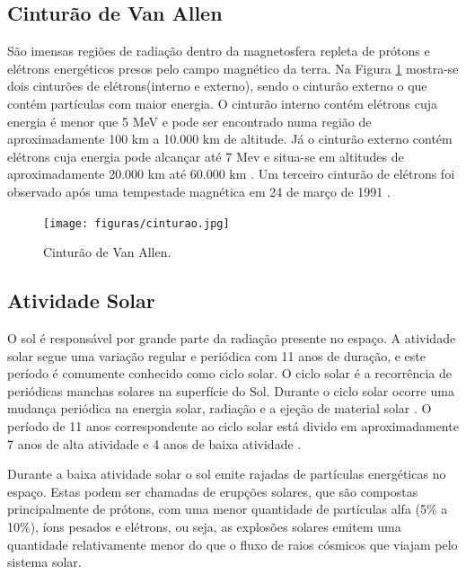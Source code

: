 \documentclass[a4paper,12pt,brazil]{ufms-cpcx}
\begin{document}
\subsection{Cinturão de Van Allen} \label{subsec: cinturao}

São imensas regiões de radiação dentro da magnetosfera repleta de prótons e elétrons energéticos presos pelo campo magnético da terra. Na Figura \ref{Img:cinturaoVanAllen} mostra-se dois cinturões de elétrons(interno e externo), sendo o cinturão externo o que contém partículas com maior energia. O cinturão interno contém elétrons cuja energia é menor que 5 MeV e pode ser encontrado numa região de aproximadamente 100 km a 10.000 km de altitude. Já o cinturão externo contém elétrons cuja energia pode alcançar até 7 Mev e situa-se em altitudes de aproximadamente 20.000 km até 60.000 km \cite{Stassinopoulos:1988}. Um terceiro cinturão de elétrons foi observado após uma tempestade magnética em 24 de março de 1991 \cite{Velazco:2007}.      

\begin{figure}
	\centering
	\texttt{[image: figuras/cinturao.jpg]}
	\caption{Cinturão de Van Allen.} %
	\label{Img:cinturaoVanAllen}
	
\end{figure}


 

\subsection{Atividade Solar}

O sol é responsável por grande parte da radiação presente no espaço. A atividade solar segue uma variação regular e periódica com 11 anos de duração, e este período é comumente conhecido como ciclo solar. O ciclo solar é a recorrência de periódicas manchas solares na superfície do Sol. Durante o ciclo solar ocorre uma mudança periódica na energia solar, radiação e a ejeção de material solar \cite{Mansoori:2013}. O período de 11 anos correspondente ao ciclo solar está divido em aproximadamente 7 anos de alta atividade e 4 anos de baixa atividade \cite{Boudenot:2007}. 

Durante a baixa atividade solar o sol emite rajadas de partículas energéticas no espaço. Estas podem ser chamadas de erupções solares, que são compostas principalmente de prótons, com uma menor quantidade de partículas alfa (5\% a 10\%), íons pesados e elétrons, ou seja, as explosões solares emitem uma quantidade relativamente menor do que o fluxo de raios cósmicos que viajam pelo sistema solar.
\end{document}
